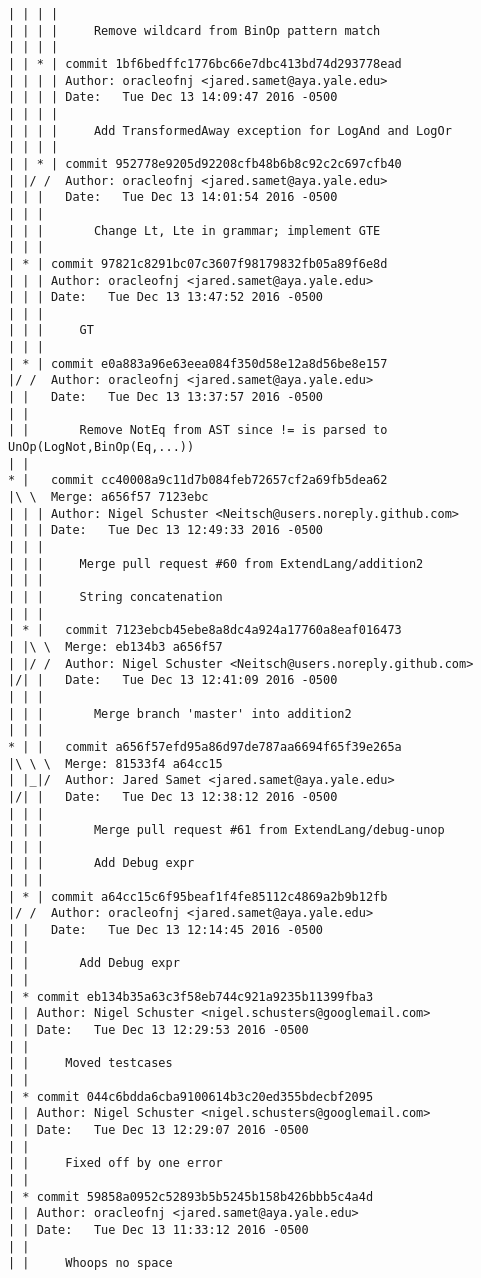 \begin{lstlisting}
| | | | 
| | | |     Remove wildcard from BinOp pattern match
| | | |     
| | * | commit 1bf6bedffc1776bc66e7dbc413bd74d293778ead
| | | | Author: oracleofnj <jared.samet@aya.yale.edu>
| | | | Date:   Tue Dec 13 14:09:47 2016 -0500
| | | | 
| | | |     Add TransformedAway exception for LogAnd and LogOr
| | | |     
| | * | commit 952778e9205d92208cfb48b6b8c92c2c697cfb40
| |/ /  Author: oracleofnj <jared.samet@aya.yale.edu>
| | |   Date:   Tue Dec 13 14:01:54 2016 -0500
| | |   
| | |       Change Lt, Lte in grammar; implement GTE
| | |    
| * | commit 97821c8291bc07c3607f98179832fb05a89f6e8d
| | | Author: oracleofnj <jared.samet@aya.yale.edu>
| | | Date:   Tue Dec 13 13:47:52 2016 -0500
| | | 
| | |     GT
| | |    
| * | commit e0a883a96e63eea084f350d58e12a8d56be8e157
|/ /  Author: oracleofnj <jared.samet@aya.yale.edu>
| |   Date:   Tue Dec 13 13:37:57 2016 -0500
| |   
| |       Remove NotEq from AST since != is parsed to UnOp(LogNot,BinOp(Eq,...))
| |     
* |   commit cc40008a9c11d7b084feb72657cf2a69fb5dea62
|\ \  Merge: a656f57 7123ebc
| | | Author: Nigel Schuster <Neitsch@users.noreply.github.com>
| | | Date:   Tue Dec 13 12:49:33 2016 -0500
| | | 
| | |     Merge pull request #60 from ExtendLang/addition2
| | |     
| | |     String concatenation
| | |      
| * |   commit 7123ebcb45ebe8a8dc4a924a17760a8eaf016473
| |\ \  Merge: eb134b3 a656f57
| |/ /  Author: Nigel Schuster <Neitsch@users.noreply.github.com>
|/| |   Date:   Tue Dec 13 12:41:09 2016 -0500
| | |   
| | |       Merge branch 'master' into addition2
| | |      
* | |   commit a656f57efd95a86d97de787aa6694f65f39e265a
|\ \ \  Merge: 81533f4 a64cc15
| |_|/  Author: Jared Samet <jared.samet@aya.yale.edu>
|/| |   Date:   Tue Dec 13 12:38:12 2016 -0500
| | |   
| | |       Merge pull request #61 from ExtendLang/debug-unop
| | |       
| | |       Add Debug expr
| | |    
| * | commit a64cc15c6f95beaf1f4fe85112c4869a2b9b12fb
|/ /  Author: oracleofnj <jared.samet@aya.yale.edu>
| |   Date:   Tue Dec 13 12:14:45 2016 -0500
| |   
| |       Add Debug expr
| |   
| * commit eb134b35a63c3f58eb744c921a9235b11399fba3
| | Author: Nigel Schuster <nigel.schusters@googlemail.com>
| | Date:   Tue Dec 13 12:29:53 2016 -0500
| | 
| |     Moved testcases
| |   
| * commit 044c6bdda6cba9100614b3c20ed355bdecbf2095
| | Author: Nigel Schuster <nigel.schusters@googlemail.com>
| | Date:   Tue Dec 13 12:29:07 2016 -0500
| | 
| |     Fixed off by one error
| |   
| * commit 59858a0952c52893b5b5245b158b426bbb5c4a4d
| | Author: oracleofnj <jared.samet@aya.yale.edu>
| | Date:   Tue Dec 13 11:33:12 2016 -0500
| | 
| |     Whoops no space

\end{lstlisting}
